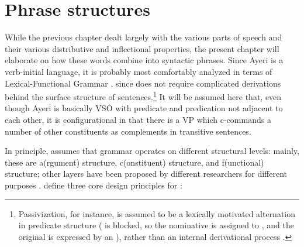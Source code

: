 
\chapter{Phrase structures}

While the previous chapter dealt largely with the various parts of speech and 
their various distributive and inflectional properties, the present chapter 
will elaborate on how these words combine into syntactic phrases. Since Ayeri 
is a verb-initial language, it is probably most comfortably analyzed in terms 
of Lexical-Functional Grammar \citep{bresnan2016}, since \Lfg{} does not 
require complicated derivations behind the surface structure of 
sentences.\footnote{Passivization, for instance, is assumed to be a lexically 
motivated alternation in predicate structure (\Sbj{} is blocked, so the 
nominative is assigned to \Obj{}, and the original \Sbj{} is expressed 
by an \Adjc{}), rather than an internal derivational process 
\citep[23\psqq]{bresnan2016}.} It will be assumed here that, even though Ayeri 
is basically VSO with predicate and predication not adjacent to each other, it 
is configurational in that there is a VP which c-commands a number of other 
constituents as complements in transitive sentences.

In principle, \Lfg{} assumes that grammar operates on different structural 
levels: mainly, these are a(rgument) structure, c(onstituent) structure, and 
f(unctional) structure; other layers have been proposed by different 
researchers for different purposes \citep[862--865]{buttking2015}. 
\citet{bresnan2016} define three core design principles for \Lfg{}:

